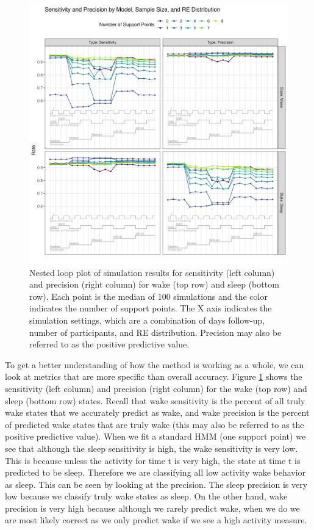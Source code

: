 \documentclass{article}
\begin{document}
\begin{figure}
\includegraphics[scale=.65]{Support/NestedLoopSP.png}
\centering
\caption{Nested loop plot of simulation results for 
sensitivity (left column) and precision (right column) 
for wake (top row) and sleep (bottom row). Each point is
 the median of 100 simulations and the color indicates 
 the number of support points. The X axis indicates the 
 simulation settings, which are a combination of days follow-up, 
 number of participants, and RE distribution. Precision may also 
 be referred to as the positive predictive value.}
\label{NL2}
\end{figure}

To get a better understanding of how the method is working as a whole, 
we can look at metrics that are more specific than overall accuracy. 
Figure \ref{NL2} shows the sensitivity (left column) and precision 
(right column) for the wake (top row) and sleep (bottom row) states. 
Recall that wake sensitivity is the percent of all truly wake states 
that we accurately predict as wake, and wake precision is the percent 
of predicted wake states that are truly wake (this may also be referred 
to as the positive predictive value). When we fit a standard HMM 
(one support point) we see that although the sleep sensitivity is high, 
the wake sensitivity is very low. This is because unless the activity 
for time t is very high, the state at time t is predicted to be sleep. 
Therefore we are classifying all low activity wake behavior as sleep. 
This can be seen by looking at the precision. The sleep precision is 
very low because we classify truly wake states as sleep. On the other hand, 
wake precision is very high because although we rarely predict wake, 
when we do we are most likely correct as we only predict wake if we 
see a high activity measure.
\end{document}
